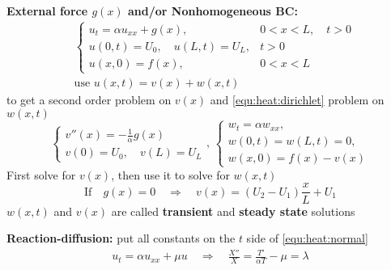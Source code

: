 \documentclass[10pt,leqno]{article}
\begin{document}
\begin{multicols}{2}
\textbf{External force $g(x)$ and/or Nonhomogeneous BC:} 
\begin{align}
    &\left\{ \begin{array}{ll}
            u_{t} = \alpha u_{xx} + g(x), & 0<x<L, \quad t>0 \\
            u(0,t) = U_0, \quad u(L,t)= U_L, & t>0 \\
            u(x,0) = f(x), & 0<x<L
    \end{array}\right. \\
    &\text{use\ } u(x,t)=v(x)+w(x,t)
\end{align}
to get a second order problem on $v(x)$ and \eqref{equ:heat:dirichlet} problem on $w(x,t)$ 
\begin{equation}
    \left\{ \begin{array}{l}
        v''(x) = -\tfrac{1}{\alpha}g(x) \\
        v(0) = U_{0}, \quad v(L)= U_{L}
    \end{array}\right., \,
    \left\{ \begin{array}{l}
            w_{t} = \alpha w_{xx}, \\
            w(0,t) = w(L,t)= 0, \\
            w(x,0) = f(x) - v(x)
    \end{array}\right.
\end{equation}
First solve for $v(x)$, then use it to solve for $w(x,t)$
\begin{equation}
\text{If}\quad g(x)=0 \quad \Rightarrow \quad v(x)=(U_{2}-U_{1})\frac{x}{L}+U_{1} 
\end{equation}
$w(x, t)$ and $v(x)$ are called \textbf{transient} and \textbf{steady state} solutions

\textbf{Reaction-diffusion:} put all constants on the $t$ side of \eqref{equ:heat:normal}
\begin{align}
 u_{t}=\alpha u_{xx} + \mu u \quad \Rightarrow \quad \frac{X''}{X} = \frac{T'}{\alpha T} -\mu = \lambda
\end{align}


\end{multicols}
\end{document}
